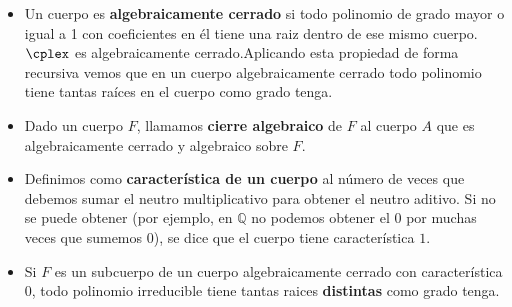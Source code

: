 \documentclass[nochap]{apuntes}
\begin{document}
\begin{itemize}
\item Un cuerpo es \textbf{algebraicamente cerrado} si todo polinomio de grado mayor o igual a 1 con coeficientes en él tiene una raiz dentro de ese mismo cuerpo. $\cplex$ es algebraicamente cerrado.Aplicando esta propiedad de forma recursiva vemos que en un cuerpo algebraicamente cerrado todo polinomio tiene tantas raíces en el cuerpo como grado tenga.

\item Dado un cuerpo $F$, llamamos \textbf{cierre algebraico} de $F$ al cuerpo $A$ que es algebraicamente cerrado y algebraico sobre $F$.

\item Definimos como \textbf{característica de un cuerpo} al número de veces que debemos sumar el neutro multiplicativo para obtener el neutro aditivo. Si no se puede obtener (por ejemplo, en $ℚ$ no podemos obtener el $0$ por muchas veces que sumemos $0$), se dice que el cuerpo tiene característica $1$.

\item Si $F$ es un subcuerpo de un cuerpo algebraicamente cerrado con característica 0, todo polinomio irreducible tiene tantas raices \textbf{distintas} como grado tenga.

\end{itemize}
\end{document}
